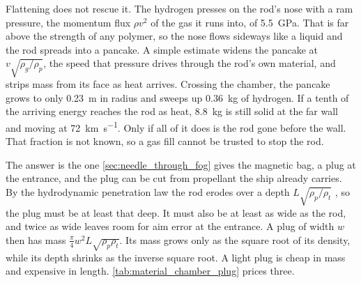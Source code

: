 \documentclass{article}
\begin{document}
Flattening does not rescue it. The hydrogen presses on the rod's nose with a ram pressure, the momentum flux $\rho v^2$ of the gas it runs into, of \SI{5.5}{\giga\pascal}. That is far above the strength of any polymer, so the nose flows sideways like a liquid and the rod spreads into a pancake. A simple estimate widens the pancake at $v\sqrt{\rho_g/\rho_p}$, the speed that pressure drives through the rod's own material, and strips mass from its face as heat arrives. Crossing the chamber, the pancake grows to only \SI{0.23}{\meter} in radius and sweeps up \SI{0.36}{\kilogram} of hydrogen. If a tenth of the arriving energy reaches the rod as heat, \SI{8.8}{\kilogram} is still solid at the far wall and moving at \SI{72}{\kilo\meter\per\second}. Only if all of it does is the rod gone before the wall. That fraction is not known, so a gas fill cannot be trusted to stop the rod.

The answer is the one \autoref{sec:needle_through_fog} gives the magnetic bag, a plug at the entrance, and the plug can be cut from propellant the ship already carries. By the hydrodynamic penetration law the rod erodes over a depth $L\sqrt{\rho_p/\rho_t}$ \cite{birkhoff1948lined}, so the plug must be at least that deep. It must also be at least as wide as the rod, and twice as wide leaves room for aim error at the entrance. A plug of width $w$ then has mass $\tfrac{\pi}{4}w^2L\sqrt{\rho_p\rho_t}$. Its mass grows only as the square root of its density, while its depth shrinks as the inverse square root. A light plug is cheap in mass and expensive in length. \autoref{tab:material_chamber_plug} prices three.
\end{document}
